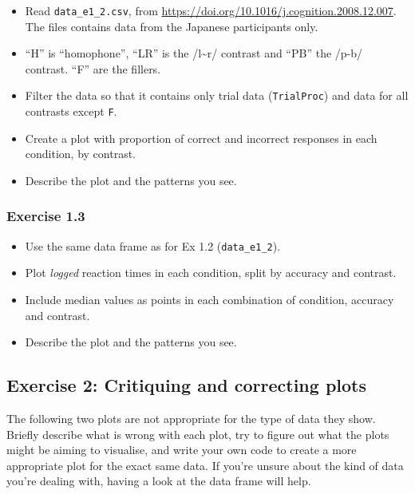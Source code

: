 \documentclass[
]{article}
\providecommand{\tightlist}{%
  \setlength{\itemsep}{0pt}\setlength{\parskip}{0pt}}
\begin{document}
\begin{itemize}
\tightlist
\item
  Read \texttt{data\_e1\_2.csv}, from
  \url{https://doi.org/10.1016/j.cognition.2008.12.007}. The files
  contains data from the Japanese participants only.
\item
  ``H'' is ``homophone'', ``LR'' is the /l\textasciitilde r/ contrast
  and ``PB'' the /p-b/ contrast. ``F'' are the fillers.
\item
  Filter the data so that it contains only trial data
  (\texttt{TrialProc}) and data for all contrasts except \texttt{F}.
\item
  Create a plot with proportion of correct and incorrect responses in
  each condition, by contrast.
\item
  Describe the plot and the patterns you see.
\end{itemize}

\subsubsection{Exercise 1.3}\label{exercise-1.3}

\begin{itemize}
\tightlist
\item
  Use the same data frame as for Ex 1.2 (\texttt{data\_e1\_2}).
\item
  Plot \emph{logged} reaction times in each condition, split by accuracy
  and contrast.
\item
  Include median values as points in each combination of condition,
  accuracy and contrast.
\item
  Describe the plot and the patterns you see.
\end{itemize}

\newpage

\subsection{Exercise 2: Critiquing and correcting
plots}\label{exercise-2-critiquing-and-correcting-plots}

The following two plots are not appropriate for the type of data they
show. Briefly describe what is wrong with each plot, try to figure out
what the plots might be aiming to visualise, and write your own code to
create a more appropriate plot for the exact same data. If you're unsure
about the kind of data you're dealing with, having a look at the data
frame will help.
\end{document}
